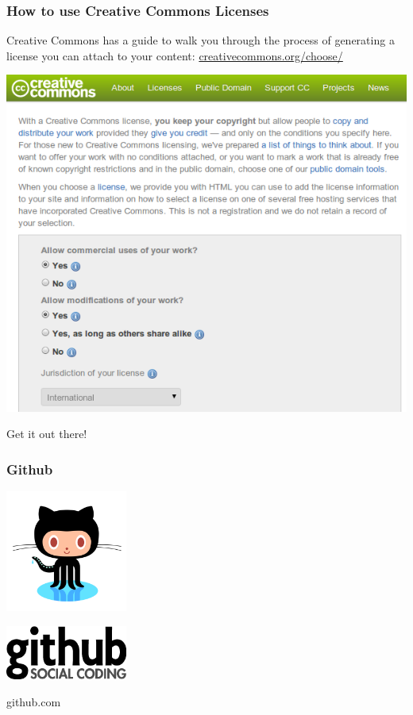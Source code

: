 \documentclass{beamer}
\begin{document}
\begin{frame}
  \frametitle{How to use Creative Commons Licenses}

  Creative Commons has a guide to walk you through the process of generating a license you can attach to your content: \href{http://creativecommons.org/choose/}{creativecommons.org/choose/}

  \begin{center}
    \includegraphics[height=0.7\textheight]{../img/cc-guide-short}
  \end{center}
  
\end{frame}



\begin{frame}
  \begin{center} \begin{Huge}Get it out there!\end{Huge} \end{center}
\end{frame}

\begin{frame}
  \frametitle{Github}
  \begin{center}
    \includegraphics[width=0.3\textwidth]{../img/octocat}

    \includegraphics[width=0.3\textwidth]{../img/github-logo}

    github.com

  \end{center}
\end{frame}
\end{document}
